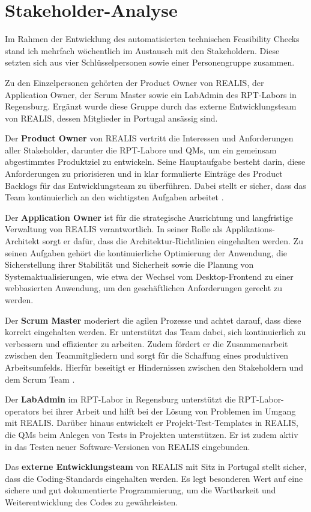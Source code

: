 \section{Stakeholder-Analyse}
Im Rahmen der Entwicklung des automatisierten technischen Feasibility Checks stand ich mehrfach wöchentlich im Austausch mit den Stakeholdern. Diese setzten sich aus vier Schlüsselpersonen sowie einer Personengruppe zusammen.

Zu den Einzelpersonen gehörten der Product Owner von \gls{REALIS}, der Application Owner, der Scrum Master sowie ein LabAdmin des \gls{RPT}-Labors in Regensburg. Ergänzt wurde diese Gruppe durch das externe Entwicklungsteam von \gls{REALIS}, dessen Mitglieder in Portugal ansässig sind.

Der \textbf{Product Owner} von \gls{REALIS} vertritt die Interessen und Anforderungen aller Stakeholder, darunter die \gls{RPT}-Labore und \glspl{QM}, um ein gemeinsam abgestimmtes Produktziel zu entwickeln. Seine Hauptaufgabe besteht darin, diese Anforderungen zu priorisieren und in klar formulierte Einträge des Product Backlogs für das Entwicklungsteam zu überführen. Dabei stellt er sicher, dass das Team kontinuierlich an den wichtigsten Aufgaben arbeitet \cite{scrumguide2020}.

Der \textbf{Application Owner} ist für die strategische Ausrichtung und langfristige Verwaltung von \gls{REALIS} verantwortlich. In seiner Rolle als Applikations-Architekt sorgt er dafür, dass die Architektur-Richtlinien eingehalten werden. Zu seinen Aufgaben gehört die kontinuierliche Optimierung der Anwendung, die Sicherstellung ihrer Stabilität und Sicherheit sowie die Planung von Systemaktualisierungen, wie etwa der Wechsel vom Desktop-Frontend zu einer webbasierten Anwendung, um den geschäftlichen Anforderungen gerecht zu werden.

Der \textbf{Scrum Master} moderiert die agilen Prozesse und achtet darauf, dass diese korrekt eingehalten werden. Er unterstützt das Team dabei, sich kontinuierlich zu verbessern und effizienter zu arbeiten. Zudem fördert er die Zusammenarbeit zwischen den Teammitgliedern und sorgt für die Schaffung eines produktiven Arbeitsumfelds. Hierfür beseitigt er Hindernissen zwischen den Stakeholdern und dem Scrum Team \cite{scrumguide2020}.

Der \textbf{LabAdmin} im \gls{RPT}-Labor in Regensburg unterstützt die \gls{RPT}-Labor-\glspl{operator} bei ihrer Arbeit und hilft bei der Lösung von Problemen im Umgang mit \gls{REALIS}. Darüber hinaus entwickelt er Projekt-Test-Templates in \gls{REALIS}, die \glspl{QM} beim Anlegen von Tests in Projekten unterstützen. Er ist zudem aktiv in das Testen neuer Software-Versionen von \gls{REALIS} eingebunden.


Das \textbf{externe Entwicklungsteam} von \gls{REALIS} mit Sitz in Portugal stellt sicher, dass die Coding-Standards eingehalten werden. Es legt besonderen Wert auf eine sichere und gut dokumentierte Programmierung, um die Wartbarkeit und Weiterentwicklung des Codes zu gewährleisten.